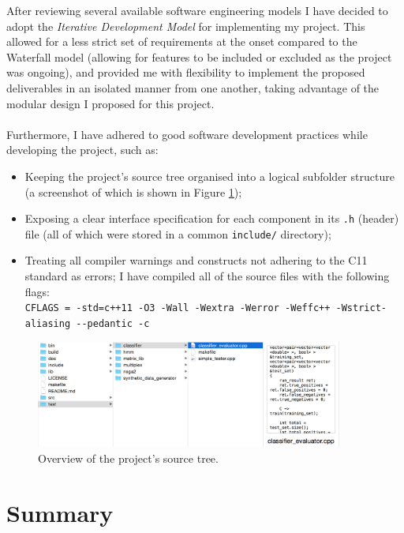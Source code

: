 \documentclass[12pt,a4paper,twoside,openright]{report}
\def\CC{{C\nolinebreak[4]\hspace{-.05em}\raisebox{.4ex}{\tiny\bf ++}}}
\begin{document}
After reviewing several available software engineering models \cite{munassar2010comparison} I have decided to adopt the \emph{Iterative Development Model} for implementing my project. This allowed for a less strict set of requirements at the onset compared to the Waterfall model (allowing for features to be included or excluded as the project was ongoing), and provided me with flexibility to implement the proposed deliverables in an isolated manner from one another, taking advantage of the modular design I proposed for this project.\\ \\
Furthermore, I have adhered to good software development practices while developing the project, such as:
\begin{itemize} 
	\item Keeping the project's source tree organised into a logical subfolder structure (a screenshot of which is shown in Figure \ref{figtree});
	\item Exposing a clear interface specification for each component in its \texttt{.h} (header) file (all of which were stored in a common \texttt{include/} directory);
	\item Treating all compiler warnings and constructs not adhering to the \CC11 standard as errors; I have compiled all of the source files with the following flags:\\ \texttt{CFLAGS = -std=c++11 -O3 -Wall -Wextra -Werror -Weffc++ -Wstrict-aliasing {-}{-}pedantic -c}
\end{itemize}
\begin{figure}[H]
	\centering
	\includegraphics[width=0.9\textwidth]{figs/organisation}
	\caption[Overview of the project's source tree]{Overview of the project's source tree.}\label{figtree}
\end{figure}

\section{Summary}
\end{document}
